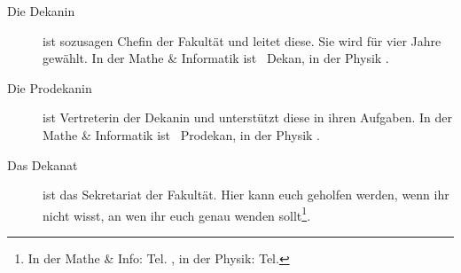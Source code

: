\begin{description}
%
%
%
%
%
%
%

\item[Die Dekanin] ist sozusagen Chefin der Fakultät und leitet diese. Sie wird für vier Jahre gewählt. In der Mathe \& Informatik ist \dekanmathelang\ Dekan, in der Physik \dekanphysiklang .

\item[Die Prodekanin] ist Vertreterin der Dekanin und unterstützt diese in ihren Aufgaben. In der Mathe \& Informatik ist \prodekanmathe\ Prodekan, in der Physik \prodekanphysik .\\[2em]

\item[Das Dekanat] ist das Sekretariat der Fakultät. Hier kann euch geholfen werden, wenn ihr nicht wisst, an wen ihr euch genau wenden sollt\footnote{In der Mathe \& Info: Tel.  \dekanatmathetelefon , in der Physik: Tel. \dekanatphysiktelefon}.


\end{description}
